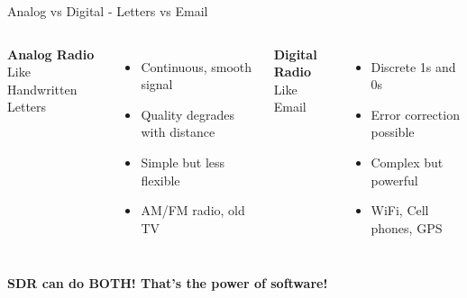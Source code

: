 \documentclass[aspectratio=169,11pt]{beamer}
\begin{document}
\begin{frame}{Analog vs Digital - Letters vs Email}
\begin{columns}
\begin{center}
\textbf{\Large Analog Radio}\\
\textcolor{radioblue}{Like Handwritten Letters}
\end{center}
\begin{itemize}
    \item Continuous, smooth signal
    \item Quality degrades with distance
    \item Simple but less flexible
    \item AM/FM radio, old TV
\end{itemize}

\begin{center}
\textbf{\Large Digital Radio}\\
\textcolor{radiogreen}{Like Email}
\end{center}
\begin{itemize}
    \item Discrete 1s and 0s
    \item Error correction possible
    \item Complex but powerful
    \item WiFi, Cell phones, GPS
\end{itemize}
\end{columns}
\vspace{1em}
\begin{center}\colorbox{yellow!20}{\parbox{0.9\textwidth}{
\centering
\textbf{SDR can do BOTH! That's the power of software!}
}}\end{center}
\end{frame}
\end{document}
